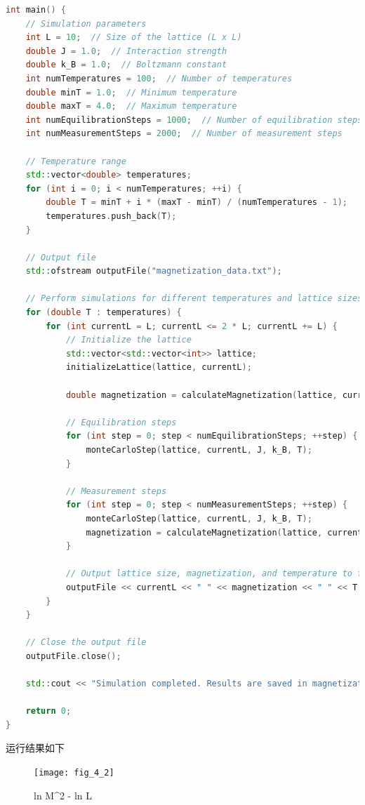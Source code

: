 \documentclass[UTF8]{ctexart}
\begin{document}
\begin{lstlisting}[language=C++, breaklines = true,label={lst:4.2}]
int main() {
    // Simulation parameters
    int L = 10;  // Size of the lattice (L x L)
    double J = 1.0;  // Interaction strength
    double k_B = 1.0;  // Boltzmann constant
    int numTemperatures = 100;  // Number of temperatures
    double minT = 1.0;  // Minimum temperature
    double maxT = 4.0;  // Maximum temperature
    int numEquilibrationSteps = 1000;  // Number of equilibration steps
    int numMeasurementSteps = 2000;  // Number of measurement steps

    // Temperature range
    std::vector<double> temperatures;
    for (int i = 0; i < numTemperatures; ++i) {
        double T = minT + i * (maxT - minT) / (numTemperatures - 1);
        temperatures.push_back(T);
    }

    // Output file
    std::ofstream outputFile("magnetization_data.txt");

    // Perform simulations for different temperatures and lattice sizes
    for (double T : temperatures) {
        for (int currentL = L; currentL <= 2 * L; currentL += L) {
            // Initialize the lattice
            std::vector<std::vector<int>> lattice;
            initializeLattice(lattice, currentL);

            double magnetization = calculateMagnetization(lattice, currentL);

            // Equilibration steps
            for (int step = 0; step < numEquilibrationSteps; ++step) {
                monteCarloStep(lattice, currentL, J, k_B, T);
            }

            // Measurement steps
            for (int step = 0; step < numMeasurementSteps; ++step) {
                monteCarloStep(lattice, currentL, J, k_B, T);
                magnetization = calculateMagnetization(lattice, currentL);
            }

            // Output lattice size, magnetization, and temperature to file
            outputFile << currentL << " " << magnetization << " " << T << std::endl;
        }
    }

    // Close the output file
    outputFile.close();

    std::cout << "Simulation completed. Results are saved in magnetization_data.txt." << std::endl;

    return 0;
}
    \end{lstlisting}

    运行结果如下
    \begin{figure}[h]
        \centering
        \texttt{[image: fig\_4\_2]}
        \caption{ln M^2 - ln L}\label{fig:4.2}
    \end{figure}
\end{document}
